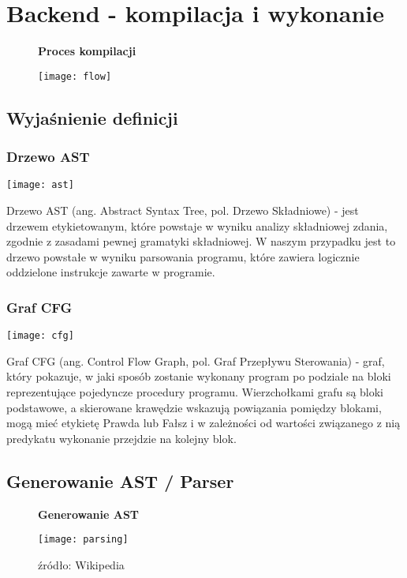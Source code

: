 \documentclass[a4paper,twoside,openright,11pt]{report}
\begin{document}
  \chapter {Backend - kompilacja i wykonanie}
  
\begin{figure}[H]
  \centering
  \textbf{Proces kompilacji}\par\medskip
  \texttt{[image: flow]}
  \caption{}
\end{figure}

  
  \section {Wyjaśnienie definicji}

  \subsection {Drzewo AST}
\begin{center}
  \texttt{[image: ast]}
\end{center}
  
\par Drzewo AST (ang. Abstract Syntax Tree, pol. Drzewo Składniowe) - jest drzewem etykietowanym, które powstaje w wyniku analizy składniowej zdania, zgodnie z zasadami pewnej gramatyki składniowej. W naszym przypadku jest to drzewo powstałe w wyniku parsowania programu, które zawiera logicznie oddzielone instrukcje zawarte w programie.



  \subsection {Graf CFG}
\begin{center}
  \texttt{[image: cfg]}
\end{center}
  
\par Graf CFG (ang. Control Flow Graph, pol. Graf Przepływu Sterowania) - graf, który pokazuje, w jaki sposób zostanie wykonany program po podziale na bloki reprezentujące pojedyncze procedury programu. Wierzchołkami grafu są bloki podstawowe, a skierowane krawędzie wskazują powiązania pomiędzy blokami, mogą mieć etykietę Prawda lub Fałsz i w zależności od wartości związanego z nią predykatu wykonanie przejdzie na kolejny blok.

  \section{Generowanie AST / Parser}
\begin{figure}[H]
  \centering
  \textbf{Generowanie AST}\par \medskip
  \texttt{[image: parsing]}
  \caption{źródło: Wikipedia}
\end{figure}
\end{document}

